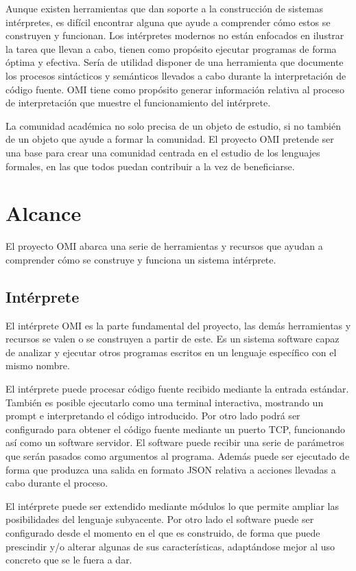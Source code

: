 Aunque existen herramientas que dan soporte a la construcción de sistemas intérpretes, es difícil encontrar alguna que ayude a comprender cómo estos se construyen y funcionan. 
Los intérpretes modernos no están enfocados en ilustrar la tarea que llevan a cabo, tienen como propósito ejecutar programas de forma óptima y efectiva. Sería de utilidad disponer de una 
herramienta que documente los procesos sintácticos y semánticos llevados a cabo durante la interpretación de código fuente. OMI tiene como propósito generar información relativa al proceso 
de interpretación que muestre el funcionamiento del intérprete. 

La comunidad académica no solo precisa de un objeto de estudio, si no también de un objeto que ayude a formar la comunidad. El proyecto OMI pretende ser una base para crear una comunidad 
centrada en el estudio de los lenguajes formales, en las que todos puedan contribuir a la vez de beneficiarse.

\section{Alcance}

El proyecto OMI abarca una serie de herramientas y recursos que ayudan a comprender 
cómo se construye y funciona un sistema intérprete.

\subsection{Intérprete}
El intérprete OMI es la parte fundamental del proyecto, las demás herramientas y recursos se valen o se construyen a partir de este. 
Es un sistema software capaz de analizar y ejecutar otros programas escritos en un lenguaje específico con el mismo nombre.

El intérprete puede procesar código fuente recibido mediante la entrada estándar. También es posible ejecutarlo como una terminal interactiva, mostrando un prompt
e interpretando el código introducido. Por otro lado podrá ser configurado para obtener el código fuente mediante un puerto TCP, funcionando así como un software 
servidor. El software puede recibir una serie de parámetros que serán pasados como argumentos al programa.  Además puede ser ejecutado de forma que produzca una salida en formato JSON relativa a acciones llevadas a cabo durante el proceso.

El intérprete puede ser extendido mediante módulos lo que permite ampliar las posibilidades del lenguaje subyacente. Por otro lado el software 
puede ser configurado desde el momento en el que es construido, de forma que puede prescindir y/o alterar algunas de sus características, adaptándose mejor 
al uso concreto que se le fuera a dar. 

